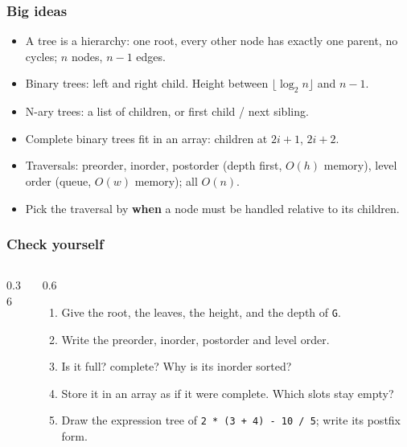 \documentclass[aspectratio=169,10pt,compress]{beamer}
\begin{document}
\begin{frame}[t,fragile] \frametitle{Big ideas}
  \begin{itemize}
    \item A tree is a hierarchy: one root, every other node has exactly one parent, no cycles; $n$ nodes, $n - 1$ edges.
    \item Binary trees: left and right child. Height between $\lfloor \log_{2} n \rfloor$ and $n - 1$.
    \item N-ary trees: a list of children, or first child / next sibling.
    \item Complete binary trees fit in an array: children at $2i + 1$, $2i + 2$.
    \item Traversals: preorder, inorder, postorder (depth first, $O(h)$ memory), level order (queue, $O(w)$ memory); all $O(n)$.
    \item Pick the traversal by \textbf{when} a node must be handled relative to its children.
  \end{itemize}
\end{frame}




\begin{frame}[t,fragile] \frametitle{Check yourself}
  \begin{columns}[T]
    \begin{column}{0.36\textwidth}
      \begin{center}
      \end{center}
    \end{column}
    \begin{column}{0.6\textwidth}
      \begin{enumerate}\small
        \item Give the root, the leaves, the height, and the depth of \texttt{G}.
        \item Write the preorder, inorder, postorder and level order.
        \item Is it full? complete? Why is its inorder sorted?
        \item Store it in an array as if it were complete. Which slots stay empty?
        \item Draw the expression tree of \texttt{2 * (3 + 4) - 10 / 5}; write its postfix form.
      \end{enumerate}
    \end{column}
  \end{columns}
\end{frame}
\end{document}

